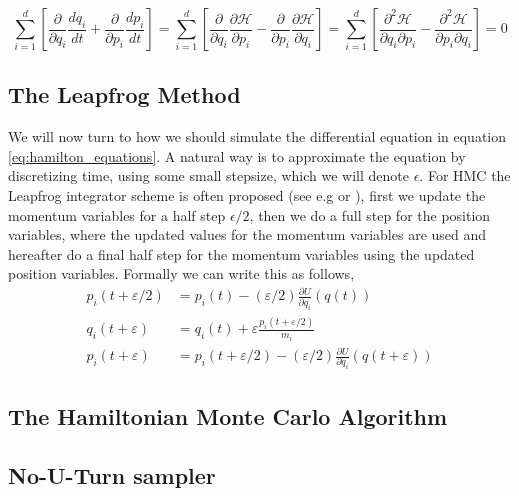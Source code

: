 \begin{equation*}
    \sum_{i=1}^{d}\left[\frac{\partial}{\partial q_{i}} \frac{d q_{i}}{d t}+\frac{\partial}{\partial p_{i}} \frac{d p_{i}}{d t}\right]=\sum_{i=1}^{d}\left[\frac{\partial}{\partial q_{i}} \frac{\partial \mathcal{H}}{\partial p_{i}}-\frac{\partial}{\partial p_{i}} \frac{\partial \mathcal{H}}{\partial q_{i}}\right]=\sum_{i=1}^{d}\left[\frac{\partial^{2} \mathcal{H}}{\partial q_{i} \partial p_{i}}-\frac{\partial^{2} \mathcal{H}}{\partial p_{i} \partial q_{i}}\right]=0
\end{equation*}

\subsection{The Leapfrog Method}
We will now turn to how we should simulate the differential equation in equation \ref{eq:hamilton_equations}. A natural way is to approximate the equation by discretizing time, using some small stepsize, which we will denote $\epsilon$.
For HMC the Leapfrog integrator scheme is often proposed (see e.g \cite{betancourt2017conceptual} or \cite{neal2012bayesian}), first we update the momentum variables for a half step $\epsilon/2$, then we do a full step for the position variables, where the updated values for the momentum variables are used and hereafter do a final half step for the momentum variables using the updated position variables. Formally we can write this as follows,
\begin{equation*}
\begin{split}
p_{i}(t+\varepsilon / 2) &=p_{i}(t)-(\varepsilon / 2) \frac{\partial U}{\partial q_{i}}(q(t)) \\
q_{i}(t+\varepsilon) &=q_{i}(t)+\varepsilon \frac{p_{i}(t+\varepsilon / 2)}{m_{i}} \\
p_{i}(t+\varepsilon) &=p_{i}(t+\varepsilon / 2)-(\varepsilon / 2) \frac{\partial U}{\partial q_{i}}(q(t+\varepsilon))
\end{split}
\end{equation*}


\subsection{The Hamiltonian Monte Carlo Algorithm}


\subsection{No-U-Turn sampler}


